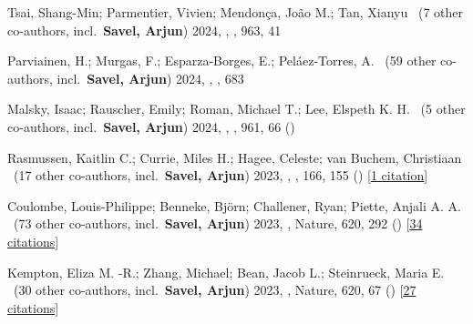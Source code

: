 \item[{\color{numcolor}\scriptsize31}] Tsai, Shang-Min; Parmentier, Vivien; Mendon{\c{c}}a, Jo{\~a}o M.; Tan, Xianyu \etal\ ({7} other co-authors, incl.\ \textbf{Savel, Arjun}) 2024, , \apj, {963}, 41

\item[{\color{numcolor}\scriptsize30}] Parviainen, H.; Murgas, F.; Esparza-Borges, E.; Pel{\'a}ez-Torres, A. \etal\ ({59} other co-authors, incl.\ \textbf{Savel, Arjun}) 2024, , \aanda, {683}

\item[{\color{numcolor}\scriptsize29}] Malsky, Isaac; Rauscher, Emily; Roman, Michael T.; Lee, Elspeth K. H. \etal\ ({5} other co-authors, incl.\ \textbf{Savel, Arjun}) 2024, , \apj, {961}, 66 ()

\item[{\color{numcolor}\scriptsize28}] Rasmussen, Kaitlin C.; Currie, Miles H.; Hagee, Celeste; van Buchem, Christiaan \etal\ ({17} other co-authors, incl.\ \textbf{Savel, Arjun}) 2023, , \aj, {166}, 155 () [\href{https://ui.adsabs.harvard.edu/abs/2023AJ....166..155R}{1 citation}]

\item[{\color{numcolor}\scriptsize27}] Coulombe, Louis-Philippe; Benneke, Bj{\"o}rn; Challener, Ryan; Piette, Anjali A. A. \etal\ ({73} other co-authors, incl.\ \textbf{Savel, Arjun}) 2023, , Nature, {620}, 292 () [\href{https://ui.adsabs.harvard.edu/abs/2023Natur.620..292C}{34 citations}]

\item[{\color{numcolor}\scriptsize26}] Kempton, Eliza M. -R.; Zhang, Michael; Bean, Jacob L.; Steinrueck, Maria E. \etal\ ({30} other co-authors, incl.\ \textbf{Savel, Arjun}) 2023, , Nature, {620}, 67 () [\href{https://ui.adsabs.harvard.edu/abs/2023Natur.620...67K}{27 citations}]

